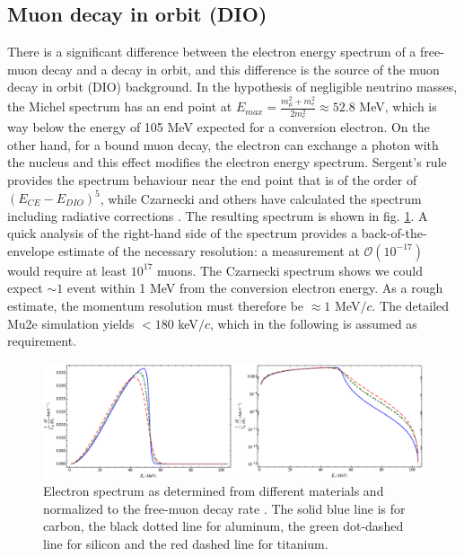 \documentclass[12pt,a4paper,openright, oneside, titlepage]{book} %
\begin{document}
\subsection{Muon decay in orbit (DIO)}
There is a significant difference between the electron energy spectrum of a free-muon decay and a decay in orbit, and this difference is the source of the muon decay in orbit (DIO) background.
In the hypothesis of negligible neutrino masses, the Michel spectrum has an end point at $E_{max}=\frac{m_\mu^2+m_e^2}{2m_e^2}\approx52.8$ MeV, which is way below the energy of 105 MeV expected for a conversion electron.
On the other hand, for a bound muon decay, the electron can exchange a photon with the nucleus and this effect modifies the electron energy spectrum. 
Sergent's rule provides the spectrum behaviour near the end point that is of the order of $(E_{CE}-E_{DIO})^5$, while Czarnecki and others have calculated the spectrum including radiative corrections \cite{Czarnecki} \cite{Czarnecki2015}.
The resulting spectrum is shown in fig. \ref{_DIO}.
A quick analysis of the right-hand side of the spectrum provides a back-of-the-envelope estimate of the necessary resolution: a measurement at $\mathcal{O}(10^{-17})$ would require at least $10^{17}$ muons. 
The Czarnecki spectrum shows we could expect $\sim1$ event within 1 MeV from the conversion electron energy. 
As a rough estimate, the momentum resolution must therefore be $\approx1$ MeV$/c$. 
The detailed Mu2e simulation yields $<180$ keV$/c$, which in the following is assumed as requirement.\\

\begin{figure}[h!]
\centering
\includegraphics[scale=0.8]{DIO_materials}
\caption[Decay In Orbit spectra]{Electron spectrum as determined from different materials
and normalized to the free-muon decay rate \cite{signorelli}. 
The solid blue line is for carbon, the black dotted line for aluminum, 
the green dot-dashed line for silicon and the red dashed line for titanium.}
\label{_DIO}
\end{figure}
\end{document}
